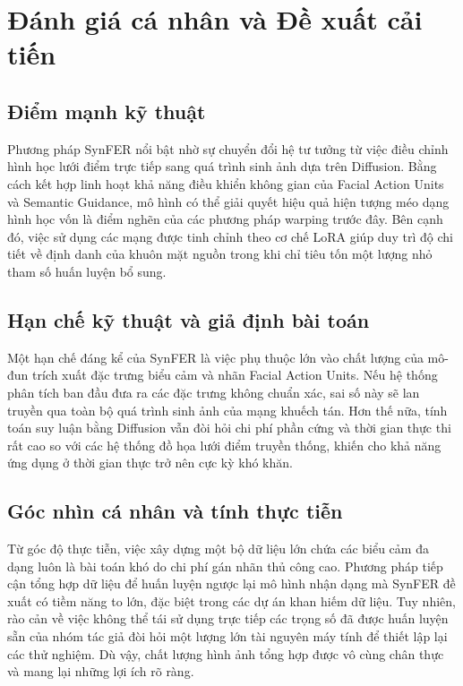 \section{Đánh giá cá nhân và Đề xuất cải tiến}

\subsection{Điểm mạnh kỹ thuật}
Phương pháp SynFER nổi bật nhờ sự chuyển đổi hệ tư tưởng từ việc điều chỉnh hình học lưới điểm trực tiếp sang quá trình sinh ảnh dựa trên Diffusion. Bằng cách kết hợp linh hoạt khả năng điều khiển không gian của Facial Action Units và Semantic Guidance, mô hình có thể giải quyết hiệu quả hiện tượng méo dạng hình học vốn là điểm nghẽn của các phương pháp warping trước đây. Bên cạnh đó, việc sử dụng các mạng được tinh chỉnh theo cơ chế LoRA giúp duy trì độ chi tiết về định danh của khuôn mặt nguồn trong khi chỉ tiêu tốn một lượng nhỏ tham số huấn luyện bổ sung.

\subsection{Hạn chế kỹ thuật và giả định bài toán}
Một hạn chế đáng kể của SynFER là việc phụ thuộc lớn vào chất lượng của mô-đun trích xuất đặc trưng biểu cảm và nhãn Facial Action Units. Nếu hệ thống phân tích ban đầu đưa ra các đặc trưng không chuẩn xác, sai số này sẽ lan truyền qua toàn bộ quá trình sinh ảnh của mạng khuếch tán. Hơn thế nữa, tính toán suy luận bằng Diffusion vẫn đòi hỏi chi phí phần cứng và thời gian thực thi rất cao so với các hệ thống đồ họa lưới điểm truyền thống, khiến cho khả năng ứng dụng ở thời gian thực trở nên cực kỳ khó khăn.

\subsection{Góc nhìn cá nhân và tính thực tiễn}
Từ góc độ thực tiễn, việc xây dựng một bộ dữ liệu lớn chứa các biểu cảm đa dạng luôn là bài toán khó do chi phí gán nhãn thủ công cao. Phương pháp tiếp cận tổng hợp dữ liệu để huấn luyện ngược lại mô hình nhận dạng mà SynFER đề xuất có tiềm năng to lớn, đặc biệt trong các dự án khan hiếm dữ liệu. Tuy nhiên, rào cản về việc không thể tái sử dụng trực tiếp các trọng số đã được huấn luyện sẵn của nhóm tác giả đòi hỏi một lượng lớn tài nguyên máy tính để thiết lập lại các thử nghiệm. Dù vậy, chất lượng hình ảnh tổng hợp được vô cùng chân thực và mang lại những lợi ích rõ ràng.

